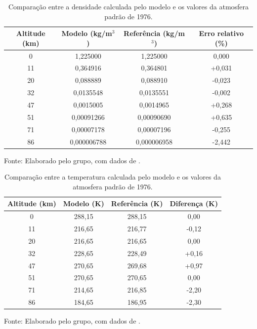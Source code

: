 \begin{table}[htbp]
    \centering
    \caption{Comparação entre a densidade calculada pelo modelo e os valores da atmosfera padrão de 1976.}
    \label{tab:validacao_densidade}
    \small
    \begin{tabular}{c|c|c|c}
        \hline
        \textbf{Altitude (km)} &
        \textbf{Modelo (kg/m$^3$)} &
        \textbf{Referência (kg/m$^3$)} &
        \textbf{Erro relativo (\%)} \\
        \hline
        0  & 1,225000   & 1,225000   &  0,000 \\
        11 & 0,364916   & 0,364801   & +0,031 \\
        20 & 0,088889   & 0,088910   & -0,023 \\
        32 & 0,0135548  & 0,0135551  & -0,002 \\
        47 & 0,0015005  & 0,0014965  & +0,268 \\
        51 & 0,00091266 & 0,00090690 & +0,635 \\
        71 & 0,00007178 & 0,00007196 & -0,255 \\
        86 & 0,000006788 & 0,000006958 & -2,442 \\
        \hline
    \end{tabular}

    \vspace{0.15cm}
    \footnotesize
    Fonte: Elaborado pelo grupo, com dados de
    \cite{USStandardAtmosphere1976}.
\end{table}


\begin{table}[htbp]
    \centering
    \caption{Comparação entre a temperatura calculada pelo modelo e os valores da atmosfera padrão de 1976.}
    \label{tab:validacao_temperatura}
    \small
    \begin{tabular}{c|c|c|c}
        \hline
        \textbf{Altitude (km)} &
        \textbf{Modelo (K)} &
        \textbf{Referência (K)} &
        \textbf{Diferença (K)} \\
        \hline
        0  & 288,15 & 288,15 &  0,00 \\
        11 & 216,65 & 216,77 & -0,12 \\
        20 & 216,65 & 216,65 &  0,00 \\
        32 & 228,65 & 228,49 & +0,16 \\
        47 & 270,65 & 269,68 & +0,97 \\
        51 & 270,65 & 270,65 &  0,00 \\
        71 & 214,65 & 216,85 & -2,20 \\
        86 & 184,65 & 186,95 & -2,30 \\
        \hline
    \end{tabular}

    \vspace{0.15cm}
    \footnotesize
    Fonte: Elaborado pelo grupo, com dados de
    \cite{USStandardAtmosphere1976}.
\end{table}

